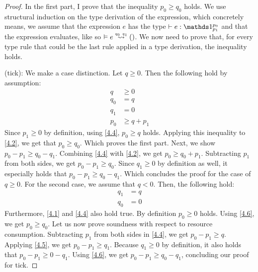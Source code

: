 \begin{proof}
In the first part, I prove that the inequality \(p_0 \geq q_0\) holds. We use structural induction on the type derivation of the expression, which concretely means, we assume that the expression \(e\) has the type \(\typing{}{e}{\ratype{\unit}{p_0}{p_1}}\) and that the expression evaluates, like so \(\evals{}{e}{()}{q_0}{q_1}\). We now need to prove that, for every type rule that could be the last rule applied in a type derivation, the inequality holds.

   (tick): We make a case distinction. Let \(q \geq 0\). Then the following hold by assumption:
   \begin{align}
      q     &\geq 0 \label{4.1}\\
      q_0   &= q \label{4.2}\\
      q_1   &= 0 \label{4.3}\\
      p_0   &\geq q + p_1 \label{4.4}
   \end{align}
   Since \(p_1 \geq 0\) by definition, using \ref{4.4}, \(p_0 \geq q\) holds. Applying this inequality to \ref{4.2}, we get that \(p_0 \geq q_0\). Which proves the first part.
   Next, we show \(p_0 - p_1 \geq q_0 - q_1\). Combining \ref{4.4} with \ref{4.2}, we get \(p_0 \geq q_0 + p_1\). Subtracting \(p_1\) from both sides, we get \(p_0 - p_1 \geq q_0\). Since \(q_1 \geq 0\) by definition as well, it especially holds that \(p_0 - p_1 \geq q_0 - q_1\). Which concludes the proof for the case of \(q \geq 0\).
   For the second case, we assume that \(q < 0\). Then, the following hold:
   \begin{align}
      q_1   &= q \label{4.5}\\
      q_0   &= 0 \label{4.6}
   \end{align}
   Furthermore, \ref{4.1} and \ref{4.4} also hold true. By definition \(p_0 \geq 0\) holds. Using \ref{4.6}, we get \(p_0 \geq q_0\). 
   Let us now prove soundness with respect to resource consumption. Subtracting \(p_1\) from both sides in \ref{4.4}, we get \(p_0 - p_1 \geq q \). Applying \cref{4.5}, we get \(p_0 - p_1 \geq q_1\). Because \(q_1 \geq 0\) by definition, it also holds that \(p_0 - p_1 \geq 0 - q_1\). Using \ref{4.6}, we get \(p_0 - p_1 \geq q_0 - q_1\), concluding our proof for tick.


\end{proof}
